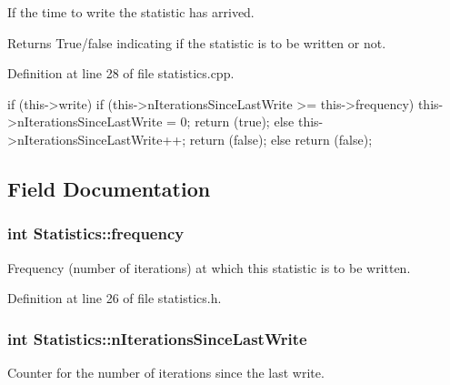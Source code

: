 \-If the time to write the statistic has arrived. 

\begin{DoxyReturn}{\-Returns}
\-True/false indicating if the statistic is to be written or not. 
\end{DoxyReturn}


\-Definition at line 28 of file statistics.\-cpp.


\begin{DoxyCode}
{
  if (this->write)
  {
    if (this->nIterationsSinceLastWrite >= this->frequency)
    {
      this->nIterationsSinceLastWrite = 0;
      return (true);
    }
    else
    {
      this->nIterationsSinceLastWrite++;
      return (false);
    }
  }
  else
  {
    return (false);
  }
}
\end{DoxyCode}


\subsection{\-Field \-Documentation}
\hypertarget{classStatistics_ae70baa09998294893b3110c61f96f4d6}{
\subsubsection[{frequency}]{\setlength{\rightskip}{0pt plus 5cm}int {\bf \-Statistics\-::frequency}}}\label{d9/d41/classStatistics_ae70baa09998294893b3110c61f96f4d6}


\-Frequency (number of iterations) at which this statistic is to be written. 



\-Definition at line 26 of file statistics.\-h.

\hypertarget{classStatistics_acb9e45f4bbb77e2232735968e7f723b3}{
\subsubsection[{n\-Iterations\-Since\-Last\-Write}]{\setlength{\rightskip}{0pt plus 5cm}int {\bf \-Statistics\-::n\-Iterations\-Since\-Last\-Write}}}\label{d9/d41/classStatistics_acb9e45f4bbb77e2232735968e7f723b3}


\-Counter for the number of iterations since the last write. 



